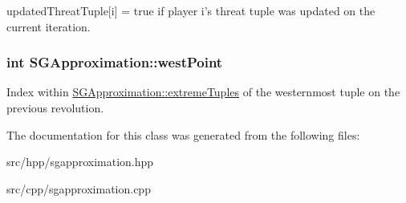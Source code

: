 updated\-Threat\-Tuple\mbox{[}i\mbox{]} = true if player i's threat tuple was updated on the current iteration. \hypertarget{classSGApproximation_ad64f17c049fda984e3f4e955a372a9d6}{
\subsubsection[{west\-Point}]{\setlength{\rightskip}{0pt plus 5cm}int S\-G\-Approximation\-::west\-Point\hspace{0.3cm}{\ttfamily [private]}}}\label{classSGApproximation_ad64f17c049fda984e3f4e955a372a9d6}
Index within \hyperlink{classSGApproximation_ac55fd302328ae8fbe4d1f8cf24a7ba32}{S\-G\-Approximation\-::extreme\-Tuples} of the westernmost tuple on the previous revolution. 

The documentation for this class was generated from the following files\-:\begin{DoxyCompactItemize}
\item 
src/hpp/sgapproximation.\-hpp\item 
src/cpp/sgapproximation.\-cpp\end{DoxyCompactItemize}
